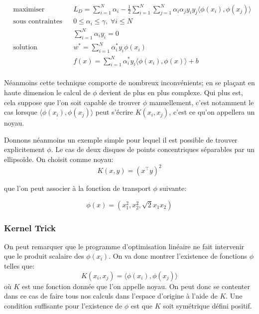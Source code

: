 \begin{equation*}
    \begin{aligned}
        & \text{maximiser}
        & & L_D = \sum_{i=1}^N \alpha_i - \frac{1}{2} \sum_{i=1}^N \sum_{j=1}^N \alpha_i \alpha_j y_i y_j \langle \phi(x_i) , \phi(x_j) \rangle \\
        & \text{sous contraintes}
        & & 0≤\alpha_i≤\gamma, \; \forall i \leq N  \\
        & & & \sum_{i=1}^N \alpha_i y_i = 0 \\
        & \text{solution}
        & & w^* = \sum_{i=1}^N \alpha_i^* y_i \phi(x_i) \\
        & & & f(x) = \sum_{i=1}^N \alpha_i^* y_i \langle \phi(x_i),\phi(x) \rangle + b \\
    \end{aligned}
\end{equation*}

Néanmoins cette technique comporte de nombreux inconvénients; en se plaçant en haute dimension le calcul de $\phi$ devient de plus en plus complexe. Qui plus est, cela suppose que l'on soit capable de trouver $\phi$ manuellement, c'est notamment le cas lorsque $\langle \phi(x_i) , \phi(x_j) \rangle$ peut s'écrire $K(x_i,x_j)$, c'est ce qu'on appellera un noyau. 

Donnons néanmoins un exemple simple pour lequel il est possible de trouver explicitement $\phi$. Le cas de deux disques de points concentriques séparables par un ellipsoïde. On choisit comme noyau:
\begin{equation*}
    K(x,y) = \left( x^\intercal y \right)^2
\end{equation*}

que l'on peut associer à la fonction de transport $\phi$ suivante: 

\begin{equation*}
    \phi(x) = \left( x_1^2, x_2^2, \sqrt{2} x_1 x_2 \right)
\end{equation*}

\subsubsection{Kernel Trick}
On peut remarquer que le programme d'optimisation linéaire ne fait intervenir que le produit scalaire des $ \phi(x_i) $. On va donc montrer l'existence de fonctions $\phi$ telles que:
\begin{equation*}
    K(x_i,x_j) = \langle \phi(x_i) , \phi(x_j ) \rangle
\end{equation*}
où $K$ est une fonction donnée que l'on appelle noyau. On peut donc se contenter dans ce cas de faire tous nos calculs dans l'espace d'origine à l'aide de $K$. Une condition suffisante pour l'existence de $\phi$ est que $K$ soit symétrique défini positif.


